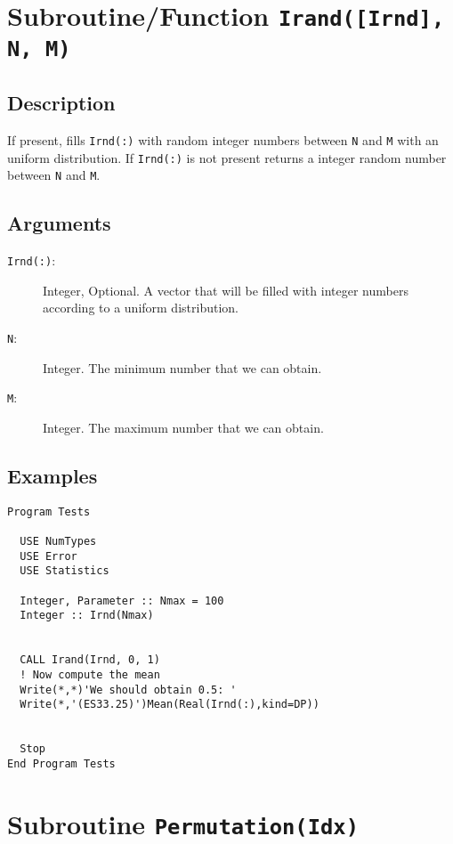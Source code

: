 \section{Subroutine/Function \texttt{Irand([Irnd], N, M)}}

\subsection{Description}

If present, fills \texttt{Irnd(:)} with random integer numbers between
\texttt{N} and \texttt{M} with an uniform distribution. If
\texttt{Irnd(:)} is not present returns a integer random number
between \texttt{N} and \texttt{M}.

\subsection{Arguments}

\begin{description}
\item[\texttt{Irnd(:)}:] Integer, Optional. A vector that will be
  filled with integer numbers according to a uniform distribution.
\item[\texttt{N}:] Integer. The minimum number that we can obtain.
\item[\texttt{M}:] Integer. The maximum number that we can obtain.
\end{description}

\subsection{Examples}

\begin{lstlisting}[emph=Irand,
                   emphstyle=\color{blue},
                   frame=trBL,
                   caption=Obtaining integer random numbers.,
                   label=irand]
Program Tests

  USE NumTypes
  USE Error
  USE Statistics

  Integer, Parameter :: Nmax = 100
  Integer :: Irnd(Nmax)


  CALL Irand(Irnd, 0, 1)
  ! Now compute the mean 
  Write(*,*)'We should obtain 0.5: '
  Write(*,'(ES33.25)')Mean(Real(Irnd(:),kind=DP))


  Stop
End Program Tests
\end{lstlisting}

\section{Subroutine \texttt{Permutation(Idx)}}


